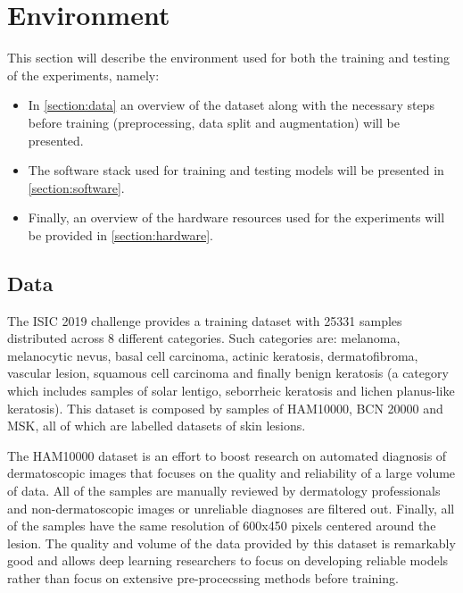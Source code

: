 \chapter{Environment}
\label{chapter:environment}

This section will describe the environment used for both the training and testing of the experiments, namely:

\begin{itemize}
    \item In \autoref{section:data} an overview of the dataset along with the necessary steps before training (preprocessing, data split and augmentation) will be presented.
    \item The software stack used for training and testing models will be presented in \autoref{section:software}.
    \item Finally, an overview of the hardware resources used for the experiments will be provided in \autoref{section:hardware}.
\end{itemize}



\section{Data}
\label{section:data}
    The \ac{ISIC} 2019 challenge \cite{isic2019} provides a training dataset with 25331 samples distributed across 8 different categories. Such categories are: melanoma, melanocytic nevus, basal cell carcinoma, actinic keratosis, dermatofibroma, vascular lesion, squamous cell carcinoma and finally benign keratosis (a category which includes samples of solar lentigo, seborrheic keratosis and lichen planus-like keratosis). This dataset is composed by samples of HAM10000, BCN 20000 and MSK, all of which are labelled datasets of skin lesions.
    
    The \ac{HAM10000} \cite{ham10000} dataset is an effort to boost research on automated diagnosis of dermatoscopic images that focuses on the quality and reliability of a large volume of data. All of the samples are manually reviewed by dermatology professionals and non-dermatoscopic images or unreliable diagnoses are filtered out. Finally, all of the samples have the same resolution of 600x450 pixels centered around the lesion. The quality and volume of the data provided by this dataset is remarkably good and allows deep learning researchers to focus on developing reliable models rather than focus on extensive pre-procecssing methods before training. \par
    

